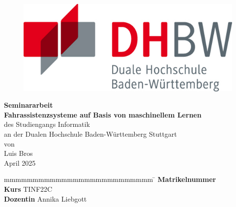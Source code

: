 \begin{titlepage}

    \begin{figure}

        \centering
        \begin{minipage}[t]{0.45\linewidth}
            \centering
            \includegraphics[width=.75\linewidth]{resources/DHBW}
        \end{minipage}

    \end{figure}

    \begin{center}
        \vspace*{12mm} {\LARGE\textbf{Seminararbeit}} \\
        \vspace*{12mm} {\large\textbf{Fahrassistenzsysteme auf Basis von maschinellem Lernen}} \\
        \vspace*{12mm} {des Studiengangs Informatik} \\
        \vspace*{3mm} {an der Dualen Hochschule Baden-Württemberg Stuttgart} \\
        \vspace*{12mm} {von} \\
        \vspace*{3mm} {Luis Bros} \\
        \vspace*{12mm} {April 2025}\\
    \end{center}

    \vfill
    \begin{spacing}{1.2}
        \begin{tabbing}
            mmmmmmmmmmmmmmmmmmmmmmmmmm              \= \kill
            \textbf{Matrikelnummer}                  \\
            \textbf{Kurs}                           \> TINF22C \\
            \textbf{Dozentin}                       \> Annika Liebgott \\
        \end{tabbing}
    \end{spacing}

    \newpage

\end{titlepage}

\pagestyle{headings}